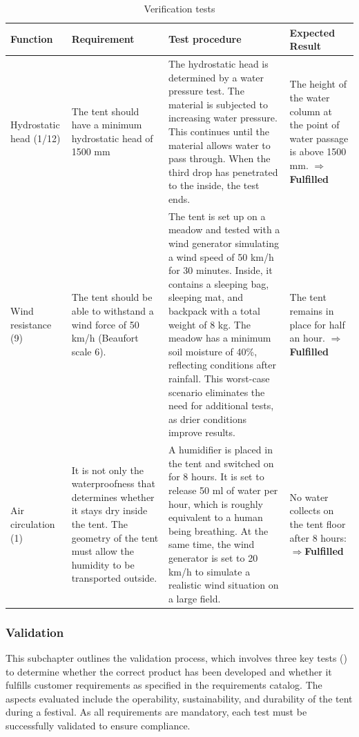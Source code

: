 \documentclass{article}
\begin{document}
\renewcommand{\arraystretch}{1.5}

\begin{table}[ht!]
    \caption{Verification tests}
    \label{tab:verification}
    \begin{tabularx}{\textwidth}{|>{\raggedright\arraybackslash}p{2.5cm}|>{\raggedright\arraybackslash}p{3.5cm}|>{\raggedright\arraybackslash}p{6cm}|>{\raggedright\arraybackslash}X|}
    \hline
    \textbf{Function} & \textbf{Requirement} & \textbf{Test procedure} & \textbf{Expected Result} \\
    \hline
    Hydrostatic head (1/12) & 
    The tent should have a minimum hydrostatic head of 1500 mm & 
    The hydrostatic head is determined by a water pressure test. The material is subjected to increasing water pressure. This continues until the material allows water to pass through. When the third drop has penetrated to the inside, the test ends. &
    The height of the water column at the point of water passage is above 1500 mm. \textcolor{newgreen}{$\Rightarrow$\textbf{Fulfilled}} \\
    \hline
    Wind resistance (9) &
    The tent should be able to withstand a wind force of 50 km/h (Beaufort scale 6). &
    The tent is set up on a meadow and tested with a wind generator simulating a wind speed of 50 km/h for 30 minutes. Inside, it contains a sleeping bag, sleeping mat, and backpack with a total weight of 8 kg. The meadow has a minimum soil moisture of 40\%, reflecting conditions after rainfall. This worst-case scenario eliminates the need for additional tests, as drier conditions improve results. &
    The tent remains in place for half an hour. \textcolor{newgreen}{$\Rightarrow$\textbf{Fulfilled}} \\
    \hline
    Air circulation (1) &
    It is not only the waterproofness that determines whether it stays dry inside the tent. The geometry of the tent must allow the humidity to be transported outside. &
    A humidifier is placed in the tent and switched on for 8 hours. It is set to release 50 ml of water per hour, which is roughly equivalent to a human being breathing. At the same time, the wind generator is set to 20 km/h to simulate a realistic wind situation on a large field. &
    No water collects on the tent floor after 8 hours: \textcolor{newgreen}{$\Rightarrow$\textbf{Fulfilled}} \\
    \hline
    \end{tabularx}
\end{table}

\subsubsection{Validation}
This subchapter outlines the validation process, which involves three key tests
() to determine whether the correct product has been developed
and whether it fulfills customer requirements as specified in the requirements catalog.
The aspects evaluated include the operability, sustainability, and durability of the tent
during a festival. As all requirements are mandatory, each test must be successfully
validated to ensure compliance.
\end{document}
